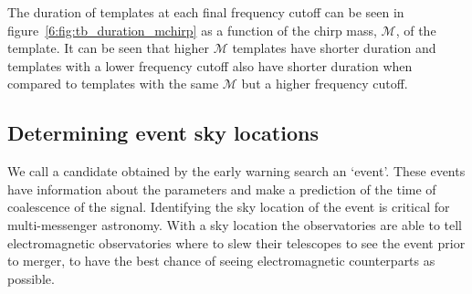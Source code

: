 %
The duration of templates at each final frequency cutoff can be seen in figure~\ref{6:fig:tb_duration_mchirp} as a function of the chirp mass, $\mathcal{M}$, of the template. It can be seen that higher $\mathcal{M}$ templates have shorter duration and templates with a lower frequency cutoff also have shorter duration when compared to templates with the same $\mathcal{M}$ but a higher frequency cutoff.

\subsection{\label{6:sec:event-localisation}Determining event sky locations}


We call a \gwadj candidate obtained by the early warning search an `event'. These events have information about the \gwadj parameters and make a prediction of the time of coalescence of the \gwadj signal. Identifying the sky location of the event is critical for multi-messenger astronomy. With a sky location the \gwadj observatories are able to tell electromagnetic observatories where to slew their telescopes to see the event prior to merger, to have the best chance of seeing electromagnetic counterparts as possible.

